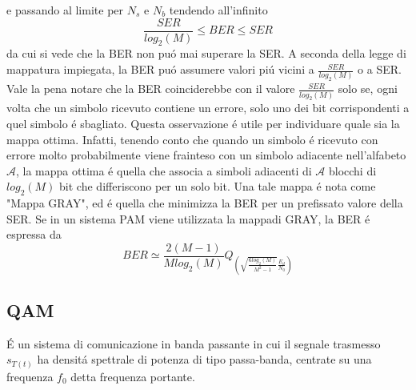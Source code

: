             e passando al limite per $N_s$ e $N_b$ tendendo all'infinito 
            \[
                \frac{SER}{log_2(M)} \leq BER \leq SER    
            \]
            da cui si vede che la BER non puó mai superare la SER. A seconda della legge di mappatura impiegata,
            la BER puó assumere valori piú vicini a $\frac{SER}{log_2(M)}$ o a SER. Vale la pena notare che la BER 
            coinciderebbe con il valore $\frac{SER}{log_2(M)}$ solo se, ogni volta che un simbolo ricevuto contiene 
            un errore, solo uno dei bit corrispondenti a quel simbolo é sbagliato. Questa osservazione é utile 
            per individuare quale sia la mappa ottima. Infatti, tenendo conto che quando un simbolo é ricevuto con errore
            molto probabilmente viene frainteso con un simbolo adiacente nell'alfabeto $\mathcal{A}$, la mappa ottima é 
            quella che associa a simboli adiacenti di $\mathcal{A}$ blocchi di $log_2(M)$ bit che differiscono per un solo bit. 
            Una tale mappa é nota come "Mappa GRAY", ed é quella che minimizza la BER per un prefissato valore della SER. 
            Se in un sistema PAM viene utilizzata la mappadi GRAY, la BER é espressa da 
            \[
                BER \simeq \frac{2(M-1)}{Mlog_2(M)}Q_{\displaystyle \left(\sqrt{\frac{6log_2(M)}{M^2-1}}\frac{E_d}{N_0}\right)}    
            \] 
    \subsection{QAM}
        É un sistema di comunicazione in {\color{red}banda passante} in cui il segnale trasmesso $s_{T(t)}$ ha densitá 
        spettrale di potenza di tipo passa-banda, centrate su una frequenza $f_0$ detta frequenza portante.
